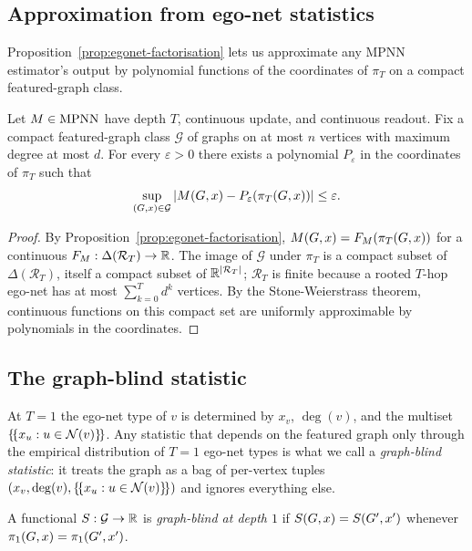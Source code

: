 \subsection{Approximation from ego-net statistics}

Proposition~\ref{prop:egonet-factorisation} lets us approximate any MPNN
estimator's output by polynomial functions of the coordinates of
$\pi_T$ on a compact featured-graph class.

\begin{proposition}\label{prop:reproduce}
Let $M \in \mathrm{MPNN}$ have depth $T$, continuous update, and continuous
readout. Fix a compact featured-graph class $\mathcal{G}$ of graphs
on at most $n$ vertices with maximum degree at most $d$. For every
$\varepsilon > 0$ there exists a polynomial $P_\varepsilon$ in the
coordinates of $\pi_T$ such that
\[
\sup_{(G, x) \in \mathcal{G}} \left|M(G, x) - P_\varepsilon(\pi_T(G, x))\right|
\le \varepsilon.
\]
\end{proposition}

\begin{proof}
By Proposition~\ref{prop:egonet-factorisation}, $M(G, x) = F_M(\pi_T(G,
x))$ for a continuous $F_M : \Delta(\mathcal{R}_T) \to \mathbb{R}$. The
image of $\mathcal{G}$ under $\pi_T$ is a compact subset of
$\Delta(\mathcal{R}_T)$, itself a compact subset of $\mathbb{R}^{|\mathcal{R}_T|}$;
$\mathcal{R}_T$ is finite because a rooted $T$-hop ego-net has at
most $\sum_{k=0}^T d^k$ vertices. By the Stone-Weierstrass theorem,
continuous functions on this compact set are uniformly approximable
by polynomials in the coordinates.
\end{proof}

\subsection{The graph-blind statistic}\label{sec:graph-blind}

At $T = 1$ the ego-net type of $v$ is determined by $x_v$, $\deg(v)$,
and the multiset $\{\!\{x_u : u \in \mathcal{N}(v)\}\!\}$. Any statistic
that depends on the featured graph only through the empirical
distribution of $T = 1$ ego-net types is what we call a
\emph{graph-blind statistic}: it treats the graph as a bag of
per-vertex tuples $(x_v, \deg(v), \{\!\{x_u : u \in \mathcal{N}(v)\}\!\})$
and ignores everything else.

\begin{definition}\label{def:graph-blind}
A functional $S : \mathcal{G} \to \mathbb{R}$ is \emph{graph-blind at depth
$1$} if $S(G, x) = S(G', x')$ whenever $\pi_1(G, x) =
\pi_1(G', x')$.
\end{definition}

